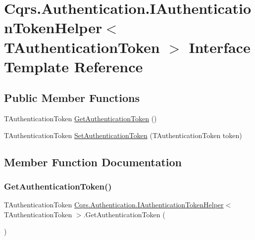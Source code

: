 \hypertarget{interfaceCqrs_1_1Authentication_1_1IAuthenticationTokenHelper}{}\section{Cqrs.\+Authentication.\+I\+Authentication\+Token\+Helper$<$ T\+Authentication\+Token $>$ Interface Template Reference}
\label{interfaceCqrs_1_1Authentication_1_1IAuthenticationTokenHelper}
\subsection*{Public Member Functions}
\begin{DoxyCompactItemize}
\item 
T\+Authentication\+Token \hyperlink{interfaceCqrs_1_1Authentication_1_1IAuthenticationTokenHelper_a4ccb928b5a6880921226508d36d4afc8_a4ccb928b5a6880921226508d36d4afc8}{Get\+Authentication\+Token} ()
\item 
T\+Authentication\+Token \hyperlink{interfaceCqrs_1_1Authentication_1_1IAuthenticationTokenHelper_a1af9409257b2d8086be6dfae4edf37fb_a1af9409257b2d8086be6dfae4edf37fb}{Set\+Authentication\+Token} (T\+Authentication\+Token token)
\end{DoxyCompactItemize}


\subsection{Member Function Documentation}
\mbox{\label{interfaceCqrs_1_1Authentication_1_1IAuthenticationTokenHelper_a4ccb928b5a6880921226508d36d4afc8_a4ccb928b5a6880921226508d36d4afc8}} 
\subsubsection{\texorpdfstring{Get\+Authentication\+Token()}{GetAuthenticationToken()}}
{\footnotesize\ttfamily T\+Authentication\+Token \hyperlink{interfaceCqrs_1_1Authentication_1_1IAuthenticationTokenHelper}{Cqrs.\+Authentication.\+I\+Authentication\+Token\+Helper}$<$ T\+Authentication\+Token $>$.Get\+Authentication\+Token (\begin{DoxyParamCaption}{ }\end{DoxyParamCaption})}

